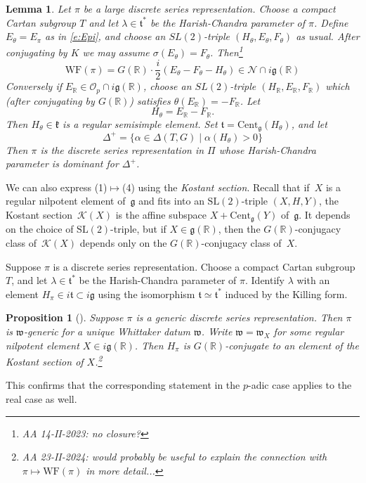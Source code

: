 \documentclass[10pt,leqno]{article}
\newtheorem{lemma}[equation]{Lemma}
\newtheorem{proposition}[equation]{Proposition}
\newcommand{\Cent}{\mathrm{Cent}}
\renewcommand{\O}{\mathcal O}
\newcommand{\R}{\mathbb R}
\newcommand{\N}{\mathcal N}
\renewcommand{\k}{\mathfrak k}
\renewcommand{\t}{\mathfrak t}
\newcommand{\g}{\mathfrak g}
\newcommand{\SL}{\text{SL}}
\newcommand{\w}{\mathfrak w}
\newcommand{\WF}{\mathrm{WF}}
\newcommand{\Op}{\O_p}
\newcommand{\Kostant}[1]{\mathcal{K}(#1)}
\begin{document}
\begin{lemma}
  Let $\pi$ be a large discrete series representation.
Choose a compact Cartan subgroup $T$ and let $\lambda\in \t^*$ be the Harish-Chandra parameter of $\pi$.
Define $E_\theta=E_\pi$ as in \eqref{e:Epi}, and choose an $SL(2)$-triple $(H_\theta,E_\theta,F_\theta)$ as usual.
After conjugating by $K$ we may assume $\sigma(E_\theta)=F_\theta$.  Then\footnote{AA 14-II-2023: no closure?}
$$
\WF(\pi)=G(\R)\cdot\frac i2(E_\theta-F_\theta-H_\theta)\in\N\cap i\g(\R)
$$
Conversely if $E_\R\in \Op\cap i\g(\R)$, choose an $SL(2)$-triple $(H_\R,E_\R,F_\R)$ which (after conjugating by $G(\R)$) satisfies $\theta(E_\R)=-F_\R$.
Let
$$
H_\theta=E_\R-F_\R.
$$
Then $H_\theta\in\k$ is a regular semisimple element.
Set $\t=\Cent_{\g}(H_\theta)$, and let
$$
\Delta^+=\{\alpha\in\Delta(T,G)\mid  \alpha(H_\theta)>0\}
$$
Then $\pi$ is the discrete series representation in $\Pi$ whose Harish-Chandra parameter is dominant for $\Delta^+$. 
\end{lemma}

We can also express (1)$\mapsto$(4) using the {\it Kostant section}. Recall that if~$X$ is a regular nilpotent element of~$\g$ and fits into an $\SL(2)$-triple $(X, H, Y)$, the Kostant section~$\Kostant{X}$ is the affine subspace $X + \mathrm{Cent}_{\g}(Y)$ of~$\g$. It depends on the choice of $\SL(2)$-triple, but if $X \in \g(\R)$, then the $G(\R)$-conjugacy class of~$\Kostant{X}$ depends only on the $G(\R)$-conjugacy class of~$X$. 

Suppose $\pi$ is a discrete series representation.
Choose a compact Cartan subgroup $T$, and let $\lambda\in\t^*$ be the Harish-Chandra parameter of $\pi$.
Identify $\lambda$ with an element $H_\pi\in i\t\subset i\g$ using the isomorphism $\t\simeq \t^*$ induced by the Killing form. 

\begin{proposition}[\cite{adams_kaletha}]
Suppose $\pi$ is a generic discrete series representation. Then $\pi$ is $\w$-generic
for a unique Whittaker datum $\w$.
Write $\w=\w_X$ for some regular nilpotent element $X\in i\g(\R)$.
Then $H_\pi$ is $G(\R)$-conjugate to an element of the Kostant section of $X$.\footnote{AA 23-II-2024: would probably be useful to explain the connection with $\pi \mapsto \WF(\pi)$ in more detail...}
\end{proposition}


This confirms that  the corresponding statement  in the $p$-adic case \cite{debacker_reeder_generic, kaletha_epipelagic}
applies to the real case as well.



\end{document}

